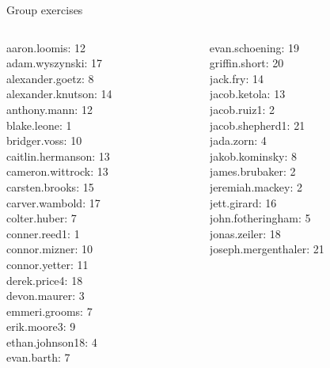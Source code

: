 \documentclass[10pt]{beamer}
\begin{document}
\begin{frame}[standout]
Group exercises
\end{frame}

\begin{frame}
\footnotesize 
\vfill 
\begin{columns}
\begin{column}{0.33\textwidth}
aaron.loomis: 12 \\ 
adam.wyszynski: 17 \\ 
alexander.goetz: 8 \\ 
alexander.knutson: 14 \\ 
anthony.mann: 12 \\ 
blake.leone: 1 \\ 
bridger.voss: 10 \\ 
caitlin.hermanson: 13 \\ 
cameron.wittrock: 13 \\ 
carsten.brooks: 15 \\ 
carver.wambold: 17 \\ 
colter.huber: 7 \\ 
conner.reed1: 1 \\ 
connor.mizner: 10 \\ 
connor.yetter: 11 \\ 
derek.price4: 18 \\ 
devon.maurer: 3 \\ 
emmeri.grooms: 7 \\ 
erik.moore3: 9 \\ 
ethan.johnson18: 4 \\ 
evan.barth: 7 \\\end{column}
\begin{column}{0.33\textwidth}
evan.schoening: 19 \\ 
griffin.short: 20 \\ 
jack.fry: 14 \\ 
jacob.ketola: 13 \\ 
jacob.ruiz1: 2 \\ 
jacob.shepherd1: 21 \\ 
jada.zorn: 4 \\ 
jakob.kominsky: 8 \\ 
james.brubaker: 2 \\ 
jeremiah.mackey: 2 \\ 
jett.girard: 16 \\ 
john.fotheringham: 5 \\ 
jonas.zeiler: 18 \\ 
joseph.mergenthaler: 21 \\ 

\end{column}
\end{columns}
\end{frame}
\end{document}
